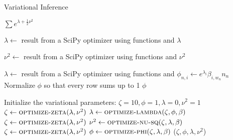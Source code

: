 \documentclass{article}
\begin{document}
\begin{algorithm}
   \caption{Variational Inference}
   \begin{algorithmic}[1]
   
      \State \Return $\sum{}{e^{\lambda + \frac{1}{2}\nu^2}}$
      \EndFunction
      
		      \State\Return 
	      \EndFunction
		      \State\Return 
	      \EndFunction
	  \State $\lambda\gets $ result from a SciPy optimizer using functions  and 
      \State \Return $\lambda$
      \EndFunction
      
		      \State\Return 
	      \EndFunction
		      \State\Return 
	      \EndFunction
	  \State $\nu^2\gets $ result from a SciPy optimizer using functions  and 
      \State \Return $\nu^2$
      \EndFunction
      
	  \State $\lambda\gets $ result from a SciPy optimizer using functions  and 
		  \State $\phi_{n,i}\gets e^{\lambda_i}\beta_{i, w_n}n_n$
		\EndFor
	  \EndFor
	  \State Normalize $\phi$ so that every row sums up to 1
      \State \Return $\phi$
      \EndFunction
   
      \State Initialize the variational parameters: $\zeta=10, \phi=1, \lambda=0, \nu^2=1$
      \State $\zeta\gets \Call{optimize-zeta}{\lambda, \nu^2}$
      \State $\lambda\gets \Call{optimize-lambda}{\zeta, \phi, \beta}$
      \State $\zeta\gets \Call{optimize-zeta}{\lambda, \nu^2}$
      \State $\nu^2\gets \Call{optimize-nu-sq}{\zeta, \lambda, \beta}$
      \State $\zeta\gets \Call{optimize-zeta}{\lambda, \nu^2}$      
      \State $\phi\gets \Call{optimize-phi}{\zeta, \lambda, \beta}$
      \EndWhile
    \State \Return ($\zeta, \phi, \lambda, \nu^2$)
    \EndFunction
\end{algorithmic}
\end{algorithm}
\end{document}
